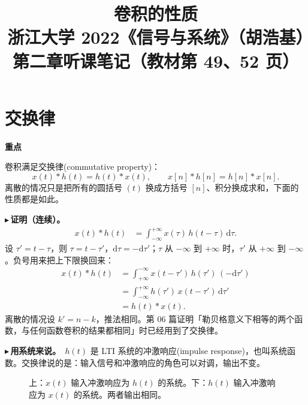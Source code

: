 \documentclass[UTF8,a4paper,11pt]{ctexart}
\title{卷积的性质\\\large 浙江大学 2022《信号与系统》（胡浩基）第二章听课笔记（教材第 49、52 页）}
\author{}
\date{}
\newenvironment{remember}{\begin{rememberbox}\textbf{重点}\par\smallskip}{\end{rememberbox}}
\newcounter{ex}[section]
\newcommand{\point}[1]{\par\addvspace{1ex}\noindent\textcolor{ptteal}{$\blacktriangleright$\,\textbf{#1}}\ }
\begin{document}
\pagestyle{plain}
\maketitle

\section{交换律}\label{sec:comm}
\begin{remember}
卷积满足交换律(commutative property)：
\[
x(t)\ast h(t)=h(t)\ast x(t),\qquad x[n]\ast h[n]=h[n]\ast x[n].
\]
离散的情况只是把所有的圆括号 $(t)$ 换成方括号 $[n]$、积分换成求和，下面的性质都是如此。
\end{remember}

\point{证明（连续）。}
\begin{align*}
x(t)\ast h(t)&=\int_{-\infty}^{+\infty}x(\tau)\,h(t-\tau)\,\mathrm{d}\tau .
\end{align*}
设 $\tau'=t-\tau$，则 $\tau=t-\tau'$，$\mathrm{d}\tau=-\mathrm{d}\tau'$；$\tau$ 从 $-\infty$ 到 $+\infty$ 时，$\tau'$ 从 $+\infty$ 到 $-\infty$。负号用来把上下限换回来：
\begin{align*}
x(t)\ast h(t)&=\int_{+\infty}^{-\infty}x(t-\tau')\,h(\tau')\,(-\mathrm{d}\tau')\\
&=\int_{-\infty}^{+\infty}h(\tau')\,x(t-\tau')\,\mathrm{d}\tau'\\
&=h(t)\ast x(t).
\end{align*}
离散的情况设 $k'=n-k$，推法相同。第 06 篇证明「勒贝格意义下相等的两个函数，与任何函数卷积的结果都相同」时已经用到了交换律。

\point{用系统来说。}$h(t)$ 是 LTI 系统的冲激响应(impulse response)，也叫系统函数。交换律说的是：输入信号和冲激响应的角色可以对调，输出不变。

\begin{figure}[H]
\centering
{}
\caption{上：$x(t)$ 输入冲激响应为 $h(t)$ 的系统。下：$h(t)$ 输入冲激响应为 $x(t)$ 的系统。两者输出相同。}
\end{figure}
\end{document}
